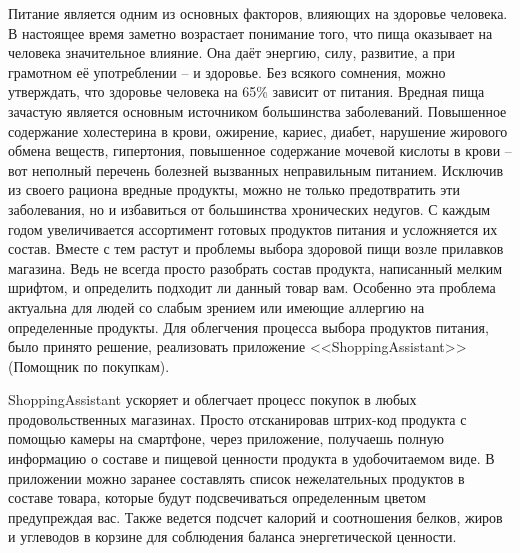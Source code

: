 

Питание является одним из основных факторов, влияющих на здоровье человека. В настоящее время заметно возрастает понимание того, что пища оказывает на человека значительное влияние. Она даёт энергию, силу, развитие, а при грамотном её употреблении – и здоровье. Без всякого сомнения, можно утверждать, что здоровье человека на 65\% зависит от питания. Вредная пища зачастую является основным источником большинства заболеваний. Повышенное содержание холестерина в крови, ожирение, кариес, диабет, нарушение жирового обмена веществ, гипертония, повышенное содержание мочевой кислоты в крови – вот неполный перечень болезней вызванных неправильным питанием. Исключив из своего рациона вредные продукты, можно не только предотвратить эти заболевания, но и избавиться от большинства хронических недугов. С каждым годом увеличивается ассортимент готовых продуктов питания и усложняется их состав. Вместе с тем растут и проблемы выбора здоровой пищи возле прилавков магазина. Ведь не всегда просто разобрать состав продукта, написанный мелким шрифтом, и определить подходит ли данный товар вам. Особенно эта проблема актуальна для людей со слабым зрением или имеющие аллергию на определенные продукты. Для облегчения процесса выбора  продуктов питания, было принято решение, реализовать приложение <<ShoppingAssistant>>(Помощник по покупкам).

	ShoppingAssistant ускоряет и облегчает процесс покупок в любых
продовольственных магазинах. Просто отсканировав штрих-код продукта
с помощью камеры на смартфоне, через приложение, получаешь полную
информацию о составе и пищевой ценности продукта в удобочитаемом
виде. В приложении можно заранее составлять список нежелательных
продуктов в составе товара, которые будут подсвечиваться определенным цветом предупреждая вас. Также ведется подсчет калорий и соотношения белков, жиров и углеводов в корзине для соблюдения баланса энергетической ценности.
\clearpage